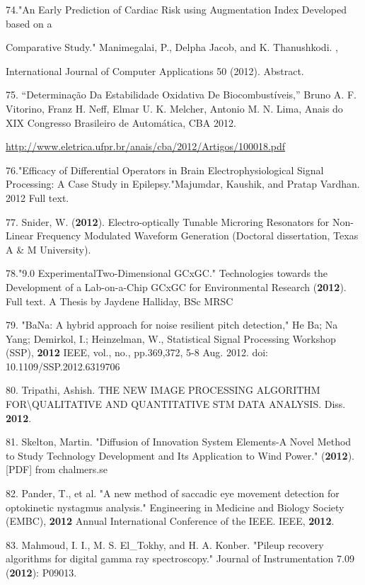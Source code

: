 74."An Early Prediction of Cardiac Risk using Augmentation Index Developed based on a

Comparative Study." Manimegalai, P., Delpha Jacob, and K. Thanushkodi. ,

International Journal of Computer Applications 50 (2012). Abstract.

75. ``Determina\c{c}\~{a}o Da Estabilidade Oxidativa De Biocombust\'{i}veis,'' Bruno A. F. Vitorino, Franz H. Neff, Elmar U. K. Melcher, Antonio M. N. Lima, Anais do XIX Congresso Brasileiro de Autom\'{a}tica, CBA 2012.

\url{http://www.eletrica.ufpr.br/anais/cba/2012/Artigos/100018.pdf}

76."Efficacy of Differential Operators in Brain Electrophysiological Signal Processing: A Case Study in Epilepsy."Majumdar, Kaushik, and Pratap Vardhan. 2012 Full text.

77. Snider, W. (\textbf{2012}). Electro-optically Tunable Microring Resonators for Non-Linear Frequency Modulated Waveform Generation (Doctoral dissertation, Texas A \& M University).

78."9.0 Experimental\textendash{}Two-Dimensional GCxGC." Technologies towards the Development of a Lab-on-a-Chip GCxGC for Environmental Research (\textbf{2012}). Full text. A Thesis by Jaydene Halliday, BSc MRSC

79. "BaNa: A hybrid approach for noise resilient pitch detection," He Ba; Na Yang; Demirkol, I.; Heinzelman, W., Statistical Signal Processing Workshop (SSP), \textbf{2012} IEEE, vol., no., pp.369,372, 5-8 Aug. 2012. doi: 10.1109/SSP.2012.6319706

80. Tripathi, Ashish. THE NEW IMAGE PROCESSING ALGORITHM FOR\textbackslash  QUALITATIVE AND QUANTITATIVE STM DATA ANALYSIS. Diss. \textbf{2012}.

81. Skelton, Martin. "Diffusion of Innovation System Elements-A Novel Method to Study Technology Development and Its Application to Wind Power." (\textbf{2012}). [PDF] from chalmers.se

82. Pander, T., et al. "A new method of saccadic eye movement detection for optokinetic nystagmus analysis." Engineering in Medicine and Biology Society (EMBC), \textbf{2012} Annual International Conference of the IEEE. IEEE, \textbf{2012}.

83. Mahmoud, I. I., M. S. El\_Tokhy, and H. A. Konber. "Pileup recovery algorithms for digital gamma ray spectroscopy." Journal of Instrumentation 7.09 (\textbf{2012}): P09013.

